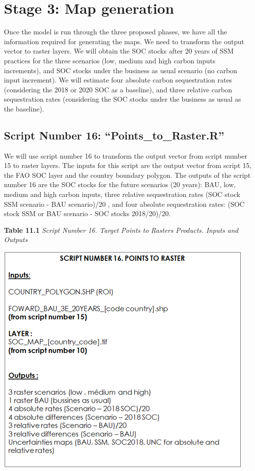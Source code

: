 \documentclass[
  10pt,
  b5paper,
]{book}
\begin{document}
\hypertarget{stage-3-map-generation}{%
\chapter{\textbar{} Stage 3: Map generation}\label{stage-3-map-generation}}

Once the model is run through the three proposed phases, we have all the information required for generating the maps. We need to transform the output vector to raster layers. We will obtain the SOC stocks after 20 years of SSM practices for the three scenarios (low, medium and high carbon inputs increments), and SOC stocks under the business as usual scenario (no carbon input increment). We will estimate four absolute carbon sequestration rates (considering the 2018 or 2020 SOC as a baseline), and three relative carbon sequestration rates (considering the SOC stocks under the business as usual as the baseline).

\hypertarget{script-number-16-points_to_raster.r}{%
\section{Script Number 16: ``Points\_to\_Raster.R''}\label{script-number-16-points_to_raster.r}}

We will use script number 16 to transform the output vector from script number 15 to raster layers. The inputs for this script are the output vector from script 15, the FAO SOC layer and the country boundary polygon. The outputs of the script number 16 are the SOC stocks for the future scenarios (20 years): BAU, low, medium and high carbon inputs, three relative sequestration rates (SOC stock SSM scenario - BAU scenario)/20 , and four absolute sequestration rates: (SOC stock SSM or BAU scenario - SOC stocks 2018/20)/20.

\textbf{Table 11.1} \emph{Script Number 16. Target Points to Rasters Products. Inputs and Outputs}

\includegraphics{tables/Table_11.1.png}
\end{document}
